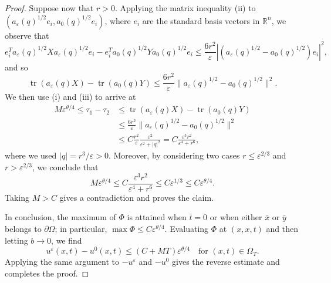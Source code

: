 \documentclass[a4paper,11pt]{amsart}
\theoremstyle{plain}
\theoremstyle{definition}
\numberwithin{equation}{section}
\begin{document}
\begin{proof}
Suppose now that $r>0$. Applying the matrix inequality (ii) to $(a_\varepsilon(q)^{1/2}e_i,a_0(q)^{1/2}e_i)$,
where $e_i$ are the standard basis vectors in $\mathbb{R}^n$,
we observe that
\begin{equation*}
    e_i^Ta_{\varepsilon}(q)^{1/2}Xa_{\varepsilon}(q)^{1/2}e_i-e_i^Ta_0(q)^{1/2}Ya_{0}(q)^{1/2}e_i \leq \frac{6r^2}{\varepsilon}\left|(a_{\varepsilon}(q)^{1/2}-a_{0}(q)^{1/2})e_i\right|^2,
\end{equation*}
and so
\begin{equation*}
    \operatorname{tr}(a_{\varepsilon}(q)X)-\operatorname{tr}(a_0(q)Y) \leq \frac{6r^2}{\varepsilon}\|a_{\varepsilon}(q)^{1/2}-a_{0}(q)^{1/2}\|^2.
\end{equation*}
We then use (i) and (iii) to arrive at
\begin{equation*}
\begin{aligned}
M\varepsilon^{\theta/4}\leq \tau_1-\tau_2&\leq
\operatorname{tr}(a_\varepsilon(q)X)-\operatorname{tr}(a_0(q)Y)\\
&\leq
\frac{6r^2}{\varepsilon}\|a_\varepsilon(q)^{1/2}-a_0(q)^{1/2}\|^2\\
&\leq C\frac{r^2}{\varepsilon}\frac{\varepsilon^2}{\varepsilon^2+|q|^2}=C\frac{\varepsilon^3r^2}{\varepsilon^4+r^6},
\end{aligned}
\end{equation*}
where we used $|q|=r^3/\varepsilon>0$. Moreover, by considering two cases $r\leq\varepsilon^{2/3}$ and $r>\varepsilon^{2/3}$, we conclude that
\begin{equation*}
    M\varepsilon^{\theta/4} \leq C\frac{\varepsilon^3r^2}{\varepsilon^4+r^6}\leq C\varepsilon^{1/3}\leq C\varepsilon^{\theta/4}.
\end{equation*}
Taking $M>C$ gives a contradiction and proves the claim.

In conclusion, the maximum of $\Phi$ is attained when $\bar t=0$ or when either $\bar x$ or $\bar y$ belongs to $\partial \Omega$; in particular, $\max\Phi\leq C\varepsilon^{\theta/4}$. Evaluating $\Phi$ at $(x,x,t)$ and then letting $b\to0$,
we find
\begin{equation*}
u^\varepsilon(x,t)-u^0(x,t) \leq (C+MT)\varepsilon^{\theta/4} \quad\text{for }(x,t)\in\Omega_T.
\end{equation*}
Applying the same argument to $-u^\varepsilon$ and $-u^0$ gives the reverse estimate and completes the proof.
\end{proof}


\end{document}
